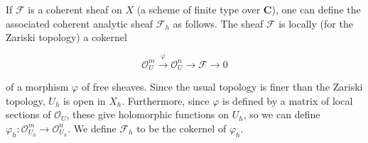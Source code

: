 If $\mathcal{F}$ is a coherent sheaf on $X$ (a scheme of finite type over $\mathbf{C}$), one can define the associated coherent analytic sheaf $\mathcal{F}_h$ as follows. The sheaf $\mathcal{F}$ is locally (for the Zariski topology) a cokernel

$$\mathcal{O}_U^m \xrightarrow{\varphi} \mathcal{O}_U^n \rightarrow \mathcal{F} \rightarrow 0$$

of a morphism $\varphi$ of free sheaves. Since the usual topology is finer than the Zariski topology, $U_h$ is open in $X_h$. Furthermore, since $\varphi$ is defined by a matrix of local sections of $\mathcal{O}_U$, these give holomorphic functions on $U_h$, so we can define $\varphi_h: \mathcal{O}_{U_h}^m \rightarrow \mathcal{O}_{U_h}^n$. We define $\mathcal{F}_h$ to be the cokernel of $\varphi_h$.
